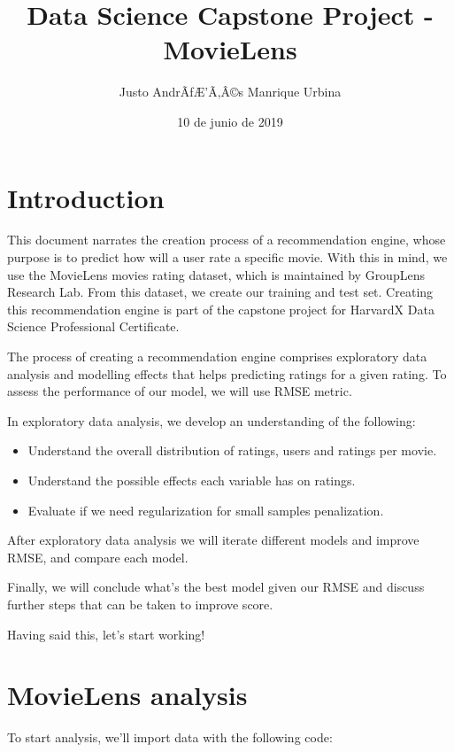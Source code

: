 \documentclass[]{article}
\title{Data Science Capstone Project - MovieLens}
\author{Justo AndrÃƒÆ'Ã‚Â©s Manrique Urbina}
\date{10 de junio de 2019}
\providecommand{\tightlist}{%
  \setlength{\itemsep}{0pt}\setlength{\parskip}{0pt}}
\begin{document}
\maketitle

\section{Introduction}\label{introduction}

This document narrates the creation process of a recommendation engine,
whose purpose is to predict how will a user rate a specific movie. With
this in mind, we use the MovieLens movies rating dataset, which is
maintained by GroupLens Research Lab. From this dataset, we create our
training and test set. Creating this recommendation engine is part of
the capstone project for HarvardX Data Science Professional Certificate.

The process of creating a recommendation engine comprises exploratory
data analysis and modelling effects that helps predicting ratings for a
given rating. To assess the performance of our model, we will use RMSE
metric.

In exploratory data analysis, we develop an understanding of the
following:

\begin{itemize}
\tightlist
\item
  Understand the overall distribution of ratings, users and ratings per
  movie.
\item
  Understand the possible effects each variable has on ratings.
\item
  Evaluate if we need regularization for small samples penalization.
\end{itemize}

After exploratory data analysis we will iterate different models and
improve RMSE, and compare each model.

Finally, we will conclude what's the best model given our RMSE and
discuss further steps that can be taken to improve score.

Having said this, let's start working!

\section{MovieLens analysis}\label{movielens-analysis}

To start analysis, we'll import data with the following code:
\end{document}
